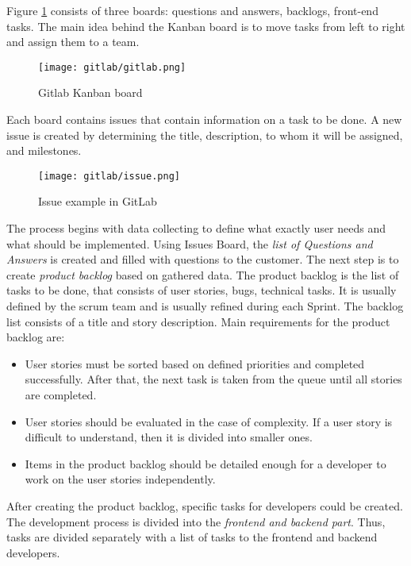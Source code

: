 \documentclass[a4paper]{article}
\begin{document}
   Figure \ref{kanbanBoard} consists of three boards: questions and answers, backlogs, front-end tasks. The main idea behind the Kanban board is to move tasks from left to right and assign them to a team. 
   
    \begin{figure}[H]
        \centering
     \texttt{[image: gitlab/gitlab.png]}
    \caption{Gitlab Kanban board}
    \label{kanbanBoard}     
    \end{figure}
    
    Each board contains issues that contain information on a task to be done. A new issue is created by determining the title, description, to whom it will be assigned, and milestones. 
       \begin{figure}[H]
        \centering
     \texttt{[image: gitlab/issue.png]}
    \caption{Issue example in GitLab}
    \label{issueExample}     
    \end{figure}

    The process begins with data collecting to define what exactly user needs and what should be implemented. Using Issues Board, the \emph{list of Questions and Answers} is created and filled with questions to the customer.
    The next step is to create \emph{product backlog} based on gathered data. The product backlog is the list of tasks to be done, that consists of user stories, bugs, technical tasks. It is usually defined by the scrum team and is usually refined during each Sprint. The backlog list consists of a title and story description. Main requirements for the product backlog are:
    \begin{itemize}
        \item User stories must be sorted based on defined priorities and completed successfully. After that, the next task is taken from the queue until all stories are completed. 
        \item User stories should be evaluated in the case of complexity. If a user story is difficult to understand, then it is divided into smaller ones.
        \item Items in the product backlog should be detailed enough for a developer to work on the user stories independently. 
    \end{itemize}
    
    After creating the product backlog, specific tasks for developers could be created. The development process is divided into the \emph{frontend and backend part}. Thus, tasks are divided separately with a list of tasks to the frontend and backend developers. 
    
\end{document}
